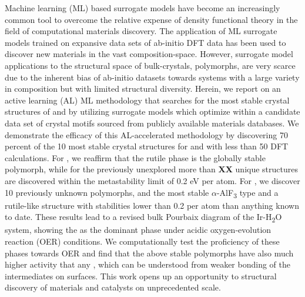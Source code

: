 %



%
Machine learning (ML) based surrogate models have become an increasingly common tool to overcome the relative expense of density functional theory in the field of computational materials discovery.
%
The application of ML surrogate models trained on expansive data sets of ab-initio DFT data has been used to discover new materials in the vast composition-space.
%
However, surrogate model applications to the structural space of bulk-crystals,  polymorphs,
are very scarce due to the inherent bias of ab-initio datasets towards systems with a large variety in composition but with limited structural diversity. 
%
Herein, we report on an active learning (AL) ML methodology that searches for the most stable crystal structures of \IrOtwo and \IrOthree by utilizing surrogate models which optimize within a candidate data set of crystal motifs sourced from publicly available materials databases.
We demonstrate the efficacy of this AL-accelerated methodology by discovering 70 percent of the 10 most stable crystal structures for \IrOtwo and \IrOthree with less than 50 DFT calculations.
For \IrOtwo, we reaffirm that the rutile phase is the globally stable polymorph,
while for the previously unexplored \IrOthree more than 
{\bf XX}%
unique structures are discovered within the metastability limit of 0.2 eV per atom.
%
For \IrOthree, we discover 10 previously unknown polymorphs, and the most stable 
$\alpha$-AlF\textsubscript{3} type and a rutile-like \IrOthree structure with stabilities lower than 0.2 per atom than anything known to date. 
%
These results lead to a revised bulk Pourbaix diagram of the Ir-H\textsubscript{2}O system, showing the \IrOthree as the dominant phase under acidic oxygen-evolution reaction (OER) conditions.
%
We computationally test the proficiency of these phases towards OER and find that the above stable \IrOthree polymorphs have also much higher activity that any \IrOtwo, which can be understood from weaker bonding of the intermediates on \IrOthree surfaces.   
%
This work opens up an opportunity to structural discovery of materials and catalysts on unprecedented scale.
